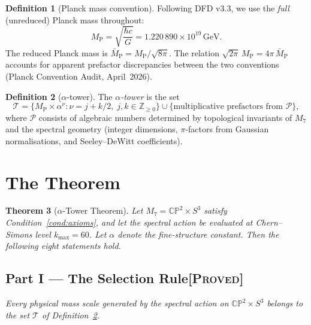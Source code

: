 \documentclass[11pt]{article}
\newtheorem{theorem}{Theorem}
\theoremstyle{definition}
\newtheorem{definition}[theorem]{Definition}
\theoremstyle{remark}
\newcommand{\CP}{\mathbb{CP}}
\newcommand{\MP}{M_{\mathrm{P}}}
\newcommand{\MPbar}{\bar{M}_{\mathrm{P}}}
\newcommand{\GeV}{\,\mathrm{GeV}}
\begin{document}
\begin{definition}[Planck mass convention]\label{def:planck}
Following DFD v3.3, we use the \emph{full} (unreduced) Planck mass
throughout:
\[
  \MP = \sqrt{\frac{\hbar c}{G}} = 1.220\,890 \times 10^{19}\GeV.
\]
The reduced Planck mass is $\MPbar = \MP/\sqrt{8\pi}$.  The relation
$\sqrt{2\pi}\,\MP = 4\pi\,\MPbar$ accounts for apparent prefactor
discrepancies between the two conventions (Planck Convention
Audit, April~2026).
\end{definition}

\begin{definition}[$\alpha$-tower]\label{def:tower}
The \emph{$\alpha$-tower} is the set
\[
  \mathcal{T} = \bigl\{\MP \times \alpha^{\nu} :
  \nu = j + k/2,\; j, k \in \mathbb{Z}_{\geq 0}\bigr\}
  \cup \{\text{multiplicative prefactors from $\mathcal{P}$}\},
\]
where $\mathcal{P}$ consists of algebraic numbers determined by
topological invariants of $M_7$ and the spectral geometry (integer
dimensions, $\pi$-factors from Gaussian normalisations, and
Seeley--DeWitt coefficients).
\end{definition}


\section{The Theorem}
\label{sec:theorem}

\begin{theorem}[$\alpha$-Tower Theorem]\label{thm:main}
Let $M_7 = \CP^2 \times S^3$ satisfy Condition~\ref{cond:axioms},
and let the spectral action be evaluated at Chern--Simons level
$k_{\max} = 60$.  Let $\alpha$ denote the fine-structure constant.
Then the following eight statements hold.
\end{theorem}

\medskip

\subsection*{Part I --- The Selection Rule\hfill\normalfont\textsc{[Proved]}}

\textit{Every physical mass scale generated by the spectral action on
$\CP^2 \times S^3$ belongs to the set $\mathcal{T}$ of
Definition~\ref{def:tower}.}
\end{document}

